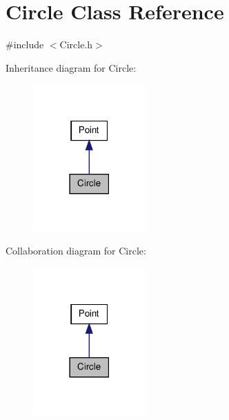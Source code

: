 \hypertarget{class_circle}{
\section{Circle Class Reference}
\label{class_circle}
}


{\ttfamily \#include $<$Circle.h$>$}



Inheritance diagram for Circle:\nopagebreak
\begin{figure}[H]
\begin{center}
\leavevmode
\includegraphics[width=122pt]{class_circle__inherit__graph}
\end{center}
\end{figure}


Collaboration diagram for Circle:\nopagebreak
\begin{figure}[H]
\begin{center}
\leavevmode
\includegraphics[width=122pt]{class_circle__coll__graph}
\end{center}
\end{figure}
